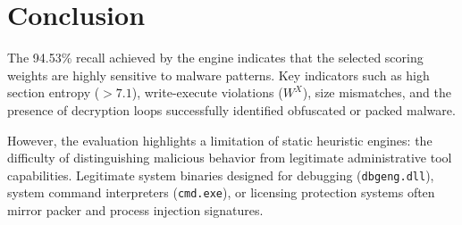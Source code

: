 \documentclass[11pt,a4paper]{article}
\begin{document}
\newpage

\section{Conclusion}

The 94.53\% recall achieved by the engine indicates that the selected scoring weights are highly sensitive to malware patterns. Key indicators such as high section entropy ($>7.1$), write-execute violations ($W^X$), size mismatches, and the presence of decryption loops successfully identified obfuscated or packed malware. 

However, the evaluation highlights a limitation of static heuristic engines: the difficulty of distinguishing malicious behavior from legitimate administrative tool capabilities. Legitimate system binaries designed for debugging (\texttt{dbgeng.dll}), system command interpreters (\texttt{cmd.exe}), or licensing protection systems often mirror packer and process injection signatures.
\end{document}
